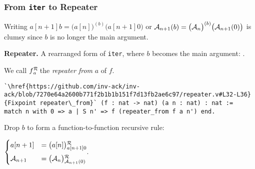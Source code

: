 \begin{frame}[fragile]
\frametitle{From \texttt{iter} to Repeater}
%
%
%

Writing $a[n+1]b = \big(a[n]\big)^{(b)}\big(a[n+1]0\big)$ or $\mathcal{A}_{n+1}(b) = \big(\mathcal{A}_n\big)^{(b)}\big(\mathcal{A}_{n+1}(0)\big)$ is clumsy since $b$ is no longer the main argument.

\bigskip

\textbf{Repeater.} A rearranged form of \texttt{iter}, where $b$ becomes the main argument:
.

\smallskip

We call $\rf{f}{a}$ the \emph{repeater from} $a$ of $f$.

\smallskip


\begin{lstlisting}
`\href{https://github.com/inv-ack/inv-ack/blob/7270e64a2600b771f2b1b1b151f7d13fb2ae6c97/repeater.v#L32-L36}{Fixpoint repeater\_from}` (f : nat -> nat) (a n : nat) : nat :=
match n with 0 => a | S n' => f (repeater_from f a n') end.
\end{lstlisting}

\smallskip

\begin{minipage}{0.4\linewidth}
	Drop $b$ to form a function-to-function recursive rule:
\end{minipage}
\quad 
$\begin{cases}
\displaystyle a[n+1] & = \rf{\big(a[n]\big)}{a[n+1]0} \\[5pt]
\Ack_{n+1} & = \rf{\big(\Ack_n\big)}{\Ack_{n+1}(0)}
\end{cases}$.

\end{frame}


